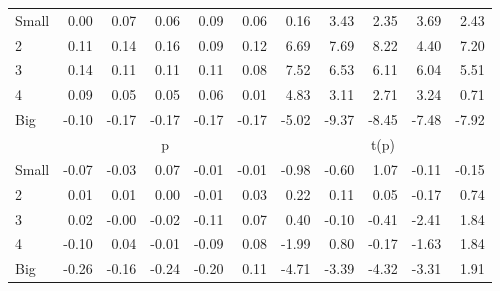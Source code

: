 \begin{table}[!ht]
\begin{tabular}{lrrrrrrrrrr}
    \\
      \cmidrule(r){2-6} \cmidrule(r){7-11}

    Small   & 0.00  & 0.07  & 0.06  & 0.09  & 0.06  & 0.16  & 3.43  & 2.35  & 3.69  & 2.43  \\
         2  & 0.11  & 0.14  & 0.16  & 0.09  & 0.12  & 6.69  & 7.69  & 8.22  & 4.40  & 7.20  \\
         3  & 0.14  & 0.11  & 0.11  & 0.11  & 0.08  & 7.52  & 6.53  & 6.11  & 6.04  & 5.51  \\
         4  & 0.09  & 0.05  & 0.05  & 0.06  & 0.01  & 4.83  & 3.11  & 2.71  & 3.24  & 0.71  \\
    Big     & -0.10  & -0.17  & -0.17  & -0.17  & -0.17  & -5.02  & -9.37  & -8.45  & -7.48  & -7.92  \\

  
    
      & \multicolumn{5}{c}{p} & \multicolumn{5}{c}{t(p)}
    
    \\
      \cmidrule(r){2-6} \cmidrule(r){7-11}

    Small   & -0.07  & -0.03  & 0.07  & -0.01  & -0.01  & -0.98  & -0.60  & 1.07  & -0.11  & -0.15  \\
         2  & 0.01  & 0.01  & 0.00  & -0.01  & 0.03  & 0.22  & 0.11  & 0.05  & -0.17  & 0.74  \\
         3  & 0.02  & -0.00  & -0.02  & -0.11  & 0.07  & 0.40  & -0.10  & -0.41  & -2.41  & 1.84  \\
         4  & -0.10  & 0.04  & -0.01  & -0.09  & 0.08  & -1.99  & 0.80  & -0.17  & -1.63  & 1.84  \\
    Big     & -0.26  & -0.16  & -0.24  & -0.20  & 0.11  & -4.71  & -3.39  & -4.32  & -3.31  & 1.91  \\

  

  \bottomrule
\end{tabular}
\label{tbl:25_Size_Inv_B2016}
\end{table}